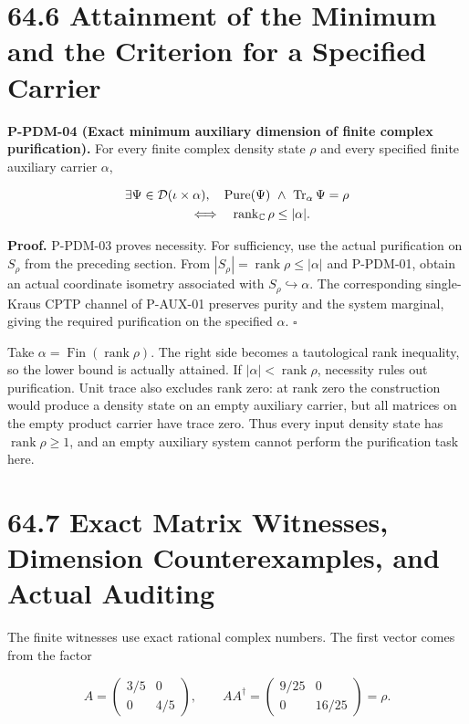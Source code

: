 \documentclass[
  11pt,
  oneside]{book}
\begin{document}
\section{64.6 Attainment of the Minimum and the Criterion for a
Specified Carrier}

\label{p-pdm-04}{}

\textbf{P-PDM-04 (Exact minimum auxiliary dimension of finite complex
purification).} For every finite complex density state \(\rho\) and
every specified finite auxiliary carrier \(\alpha\),

\[
\begin{aligned}
&\exists\Psi\in\mathcal D(\iota\times\alpha),\quad
  \operatorname{Pure}(\Psi)\ \land\ \operatorname{Tr}_\alpha\Psi=\rho\\
&\hspace{18mm}\Longleftrightarrow\quad
  \operatorname{rank}_{\mathbb C}\rho\le|\alpha|.
\end{aligned}
\]

\textbf{Proof.} P-PDM-03 proves necessity. For sufficiency, use the
actual purification on \(S_\rho\) from the preceding section. From
\(|S_\rho|=\operatorname{rank}\rho\le|\alpha|\) and P-PDM-01, obtain an
actual coordinate isometry associated with
\(S_\rho\hookrightarrow\alpha\). The corresponding single-Kraus CPTP
channel of P-AUX-01 preserves purity and the system marginal, giving the
required purification on the specified \(\alpha\). \(\square\)

Take \(\alpha=\operatorname{Fin}(\operatorname{rank}\rho)\). The right
side becomes a tautological rank inequality, so the lower bound is
actually attained. If \(|\alpha|<\operatorname{rank}\rho\), necessity
rules out purification. Unit trace also excludes rank zero: at rank zero
the construction would produce a density state on an empty auxiliary
carrier, but all matrices on the empty product carrier have trace zero.
Thus every input density state has \(\operatorname{rank}\rho\ge1\), and
an empty auxiliary system cannot perform the purification task here.

\section{64.7 Exact Matrix Witnesses, Dimension Counterexamples, and
Actual Auditing}

The finite witnesses use exact rational complex numbers. The first
vector comes from the factor

\[
A=\begin{pmatrix}3/5&0\\0&4/5\end{pmatrix},
\qquad
AA^\dagger=\begin{pmatrix}9/25&0\\0&16/25\end{pmatrix}=\rho.
\]
\end{document}
